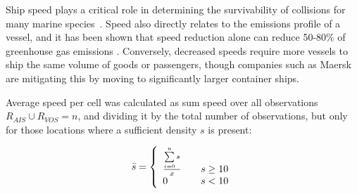 \documentclass[12pt,letterpaper]{article}
\begin{document}
Ship speed plays a critical role in determining the survivability of collisions for many marine species~\citep{Vanderlaan2009}. Speed also directly relates to the emissions profile of a vessel, and it has been shown that speed reduction alone can reduce 50-80\% of greenhouse gas emissions \cite{lack2011impact}. Conversely, decreased speeds require more vessels to ship the same volume of goods or passengers, though companies such as Maersk are mitigating this by moving to significantly larger container ships.

Average speed per cell was calculated as sum speed over all observations $R_{AIS} \cup R_{VOS} = n$, and dividing it by the total number of observations, but only for those locations where a sufficient density $s$ is present: 

\begin{equation}
 \bar{s} = \left\{
   \begin{array}{l l}
    \frac{\sum\limits_{i=0}^n s}{x} & \quad \text{$s \ge 10$}\\
    0 & \quad \text {$s < 10$}
   \end{array}\right.
\end{equation}






\end{document}
